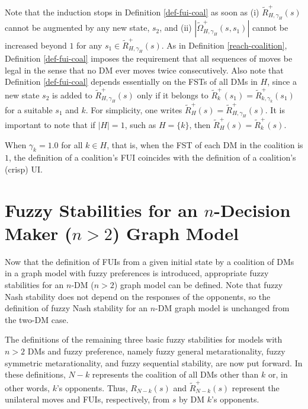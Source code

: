 Note that the induction stops in Definition \ref{def-fui-coal} as soon as (i) $\widetilde{R}_{H, \gamma_H}^+(s)$ cannot be augmented by any new state, $s_2$, and (ii)  $|\widetilde{\Omega}_{H, \gamma_H}^+(s, s_1)|$ cannot be increased beyond $1$ for any $s_1 \in \widetilde{R}_{H, \gamma_H}^+(s)$. As in Definition \ref{reach-coalition}, Definition \ref{def-fui-coal} imposes the requirement that all sequences of moves be legal in the sense that no DM ever moves twice consecutively. Also note that Definition \ref{def-fui-coal} depends essentially on the FSTs of all DMs in $H$, since a new state $s_2$ is added to $\widetilde{R}_{H, \gamma_H}^+(s)$ only if it belongs to $\widetilde{R}_k^+(s_1) = \widetilde{R}_{k, \gamma_k}^+(s_1)$ for a suitable $s_1$ and $k$. For simplicity, one writes $\widetilde{R}_H^+(s) = \widetilde{R}_{H, \gamma_H}^+(s)$. It is important to note that if $|H|=1$, such as $H = \{k\}$, then $\widetilde{R}_H^+(s)=\widetilde{R}_k^+(s)$.

\begin{remark}\label{rmk-fui-coal}
\rm When $\gamma_k=1.0$ for all $k \in H$, that is, when the FST of each DM in the coalition is $1$, the definition of a coalition's FUI coincides with the definition of a coalition's (crisp) UI.
\end{remark}


\section{Fuzzy Stabilities for an $n$-Decision Maker ($n>2$) Graph Model}\label{sec-fuz-stabl-ndm}

Now that the definition of FUIs from a given initial state by a coalition of DMs in a graph model with fuzzy preferences is introduced, appropriate fuzzy stabilities for an $n$-DM ($n>2$) graph model can be defined. Note that fuzzy Nash stability does not depend on the responses of the opponents, so the definition of fuzzy Nash stability for an $n$-DM graph model is unchanged from the two-DM case.

The definitions of the remaining three basic fuzzy stabilities for models with $n > 2$ DMs and fuzzy preference, namely fuzzy general metarationality, fuzzy symmetric metarationality, and fuzzy sequential stability, are now put forward. In these definitions, $N - k$ represents the coalition of all DMs other than $k$ or, in other words, $k$'s opponents. Thus, $R_{N-k}(s)$ and $\widetilde{R}_{N-k}^+(s)$ represent the unilateral moves and FUIs, respectively, from $s$ by DM $k$'s opponents.

